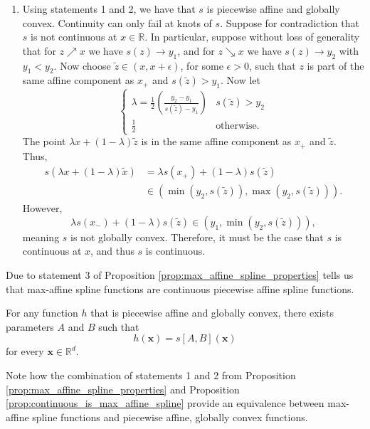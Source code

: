 \begin{tproof}
\begin{enumerate}
        \item Using statements 1 and 2, we have that $s$ is piecewise affine and globally convex. Continuity can only fail at knots of $s$. Suppose for contradiction that $s$ is not continuous at $x\in\mathbb{R}$. In particular, suppose without loss of generality that for $z\nearrow x$ we have $s(z)\to y_1$, and for $z\searrow x$ we have $s(z)\to y_2$ with $y_1<y_2$. Now choose $\tilde{z}\in\left(x,x+\epsilon\right)$, for some $\epsilon>0$, such that $z$ is part of the same affine component as $x_+$ and $s\left(\tilde{z}\right)>y_1$. Now let $$\begin{cases}\lambda=\frac{1}{2}\left(\frac{y_2-y_1}{s\left(\tilde{z}\right)-y_1}\right)&s\left(\tilde{z}\right)>y_2\\\frac{1}{2}&\text{otherwise.}\end{cases}$$The point $\lambda x+(1-\lambda)\tilde{z}$ is in the same affine component as $x_+$ and $\tilde{z}$. Thus, 
        \begin{align*}
            s\left(\lambda x+(1-\lambda)\tilde{x}\right)&=\lambda s\left(x_+\right)+(1-\lambda)s\left(\tilde{z}\right)\\&\in\left(\min\left(y_2,s\left(\tilde{z}\right)\right),\max\left(y_2,s\left(\tilde{z}\right)\right)\right).
        \end{align*}
        However, $$\lambda s\left(x_-\right)+(1-\lambda)s\left(\tilde{z}\right)\in\left(y_1,\min\left(y_2,s\left(\tilde{z}\right)\right)\right),$$meaning $s$ is not globally convex. Therefore, it must be the case that $s$ is continuous at $x$, and thus $s$ is continuous.
    \end{enumerate}
\end{tproof}

Due to statement 3 of Proposition \ref{prop:max_affine_spline_properties} tells us that max-affine spline functions are continuous piecewise affine spline functions.

\begin{proposition}\label{prop:continuous_is_max_affine_spline}
    For any function $h$ that is piecewise affine and globally convex, there exists parameters $A$ and $B$ such that $$h(\mathbf{x})=s[A,B](\mathbf{x})$$for every $\mathbf{x}\in\mathbb{R}^d$.
\end{proposition}

\begin{remark}
    Note how the combination of statements 1 and 2 from Proposition \ref{prop:max_affine_spline_properties} and Proposition \ref{prop:continuous_is_max_affine_spline} provide an equivalence between max-affine spline functions and piecewise affine, globally convex functions.
\end{remark}

